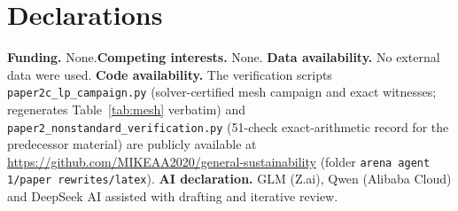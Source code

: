 \documentclass[10pt,twocolumn]{article}
\theoremstyle{definition}
\begin{document}
\section*{Declarations}

\textbf{Funding.} None.\quad \textbf{Competing interests.} None.\quad
\textbf{Data availability.} No external data were used.\quad
\textbf{Code availability.} The verification scripts
\texttt{paper2c\_lp\_campaign.py} (solver-certified mesh campaign and exact
witnesses; regenerates Table~\ref{tab:mesh} verbatim) and
\texttt{paper2\_nonstandard\_verification.py} (51-check exact-arithmetic
record for the predecessor material) are publicly available at
\url{https://github.com/MIKEAA2020/general-sustainability} (folder
\texttt{arena agent 1/paper rewrites/latex}).\quad
\textbf{AI declaration.} GLM (Z.ai), Qwen (Alibaba Cloud) and DeepSeek AI
assisted with drafting and iterative review.
\end{document}
